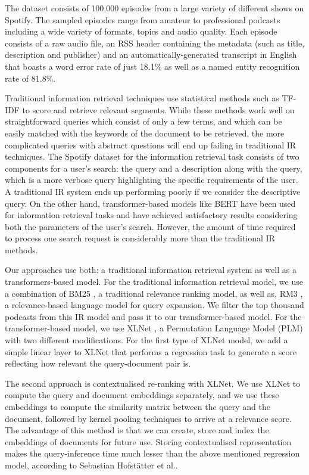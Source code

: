 \documentclass[10pt,twocolumn]{article}
\begin{document}
The dataset consists of 100,000 episodes from a large variety of different shows on Spotify. The sampled episodes range from amateur to professional podcasts including a wide variety of formats, topics and audio quality. Each episode consists of a raw audio file, an RSS header containing the metadata (such as title, description and publisher) and an automatically-generated transcript in English that boasts a word error rate of just 18.1\% as well as a named entity recognition rate of 81.8\%.

Traditional information retrieval techniques use statistical methods such as TF-IDF to score and retrieve relevant segments. While these methods work well on straightforward queries which consist of only a few terms, and which can be easily matched with the keywords of the document to be retrieved, the more complicated queries with abstract questions will end up failing in traditional IR techniques. The Spotify dataset \cite{spotify} for the information retrieval task consists of two components for a user's search: the query and a description along with the query, which is a more verbose query highlighting the specific requirements of the user. A traditional IR system ends up performing poorly if we consider the descriptive query. On the other hand, transformer-based models like BERT have been used for information retrieval tasks and have achieved satisfactory results considering both the parameters of the user's search. However, the amount of time required to process one search request is considerably more than the traditional IR methods.

Our approaches use both: a traditional information retrieval system as well as a transformers-based model. For the traditional information retrieval model, we use a combination of BM25 \cite{bm25}, a traditional relevance ranking model, as well as, RM3 \cite{rm3}, a relevance-based language model for query expansion. We filter the top thousand podcasts from this IR model and pass it to our transformer-based model. For the transformer-based model, we use XLNet \cite{XLNet}, a Permutation Language Model (PLM) with two different modifications. For the first type of XLNet model, we add a simple linear layer to XLNet that performs a regression task to generate a score reflecting how relevant the query-document pair is.

The second approach is contextualised re-ranking with XLNet. We use XLNet to compute the query and document embeddings separately, and we use these embeddings to compute the similarity matrix between the query and the document, followed by kernel pooling techniques to arrive at a relevance score. The advantage of this method is that we can create, store and index the embeddings of documents for future use. Storing contextualised representation makes the query-inference time much lesser than the above mentioned regression model, according to Sebastian Hofstätter et al.\cite{SimpleContextualisation}.
\end{document}
